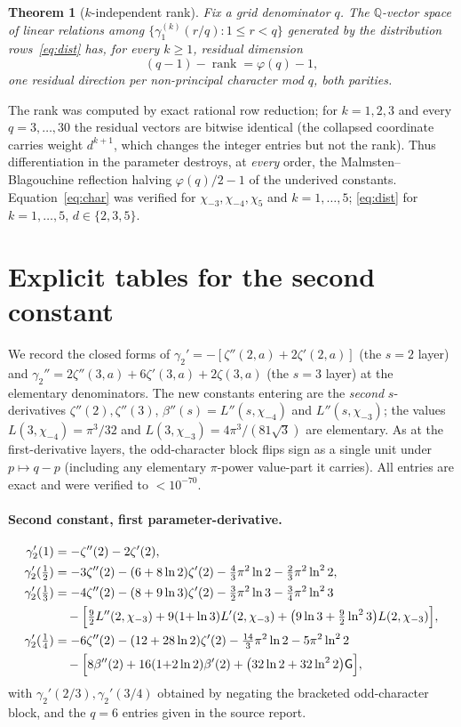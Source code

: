 \documentclass[11pt]{article}
\newtheorem{theorem}{Theorem}[section]
\theoremstyle{remark}
\newcommand{\Cat}{\mathsf{G}}
\newcommand{\Q}{\mathbb{Q}}
\newcommand{\chim}[1]{\chi_{-#1}}
\begin{document}
\begin{theorem}[$k$-independent rank]\label{thm:rank}
Fix a grid denominator $q$. The $\Q$-vector space of linear relations among
$\{\gamma_1^{(k)}(r/q):1\le r<q\}$ generated by the distribution
rows~\eqref{eq:dist} has, for every $k\ge1$, residual dimension
\[
  (q-1)-\operatorname{rank}=\varphi(q)-1 ,
\]
one residual direction per non-principal character mod $q$, both parities.
\end{theorem}

The rank was computed by exact rational row reduction; for $k=1,2,3$ and every
$q=3,\dots,30$ the residual vectors are bitwise identical (the collapsed
coordinate carries weight $d^{k+1}$, which changes the integer entries but not
the rank). Thus differentiation in the parameter destroys, at \emph{every}
order, the Malmsten--Blagouchine reflection halving $\varphi(q)/2-1$ of the
underived constants. Equation~\eqref{eq:char} was verified for
$\chim3,\chim4,\chi_5$ and $k=1,\dots,5$; \eqref{eq:dist} for
$k=1,\dots,5$, $d\in\{2,3,5\}$.

\section{Explicit tables for the second constant}\label{sec:tables}

We record the closed forms of $\gamma_2'=-[\zeta''(2,a)+2\zeta'(2,a)]$ (the
$s=2$ layer) and $\gamma_2''=2\zeta''(3,a)+6\zeta'(3,a)+2\zeta(3,a)$ (the $s=3$
layer) at the elementary denominators. The new constants entering are the
\emph{second} $s$-derivatives $\zeta''(2),\zeta''(3)$, $\beta''(s)=L''(s,\chim4)$
and $L''(s,\chim3)$; the values $L(3,\chim4)=\pi^3/32$ and
$L(3,\chim3)=4\pi^3/(81\sqrt3)$ are elementary. As at the first-derivative
layers, the odd-character block flips sign as a single unit under $p\mapsto q-p$
(including any elementary $\pi$-power value-part it carries). All entries are
exact and were verified to $<10^{-70}$.

\paragraph{Second constant, first parameter-derivative.}
\begin{align*}
\gamma_2'(1)   &= -\zeta''(2)-2\zeta'(2),\\
\gamma_2'(\tfrac12) &= -3\zeta''(2)-(6+8\ln2)\zeta'(2)-\tfrac43\pi^2\ln2-\tfrac23\pi^2\ln^2 2,\\
\gamma_2'(\tfrac13) &= -4\zeta''(2)-(8+9\ln3)\zeta'(2)-\tfrac32\pi^2\ln3-\tfrac34\pi^2\ln^2 3\\
 &\quad -\Bigl[\tfrac92 L''(2,\chim3)+9(1{+}\ln3)L'(2,\chim3)+\bigl(9\ln3+\tfrac92\ln^2 3\bigr)L(2,\chim3)\Bigr],\\
\gamma_2'(\tfrac14) &= -6\zeta''(2)-(12+28\ln2)\zeta'(2)-\tfrac{14}{3}\pi^2\ln2-5\pi^2\ln^2 2\\
 &\quad -\Bigl[8\beta''(2)+16(1{+}2\ln2)\beta'(2)+\bigl(32\ln2+32\ln^2 2\bigr)\Cat\Bigr],
\end{align*}
with $\gamma_2'(2/3),\gamma_2'(3/4)$ obtained by negating the bracketed
odd-character block, and the $q=6$ entries given in the source report.
\end{document}

